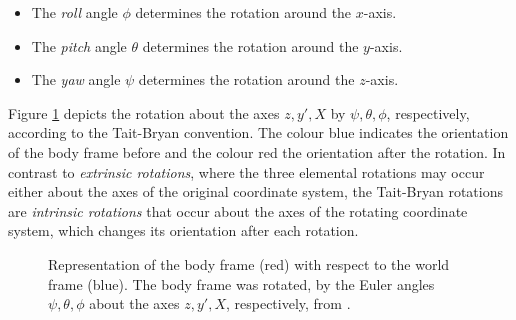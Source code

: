 \begin{itemize}
\item The \emph{roll} angle $\phi$ determines the rotation around the $x$-axis.
\item The \emph{pitch} angle $\theta$ determines the rotation around the $y$-axis.
\item The \emph{yaw} angle $\psi$ determines the rotation around the $z$-axis.
\end{itemize}

\noindent
Figure \ref{fig:Euler_angles} depicts the rotation about the axes $z, y', X$ by $\psi, \theta, \phi$, respectively, according to the Tait-Bryan convention. The colour blue indicates the orientation of the body frame before and the colour red the orientation after the rotation. In contrast to \emph{extrinsic rotations}, where the three elemental rotations may occur either about the axes of the original coordinate system, the Tait-Bryan rotations are \emph{intrinsic rotations} that occur about the axes of the rotating coordinate system, which changes its orientation after each rotation.

\begin{figure}
\centering
{}
\caption{Representation of the body frame (red) with respect to the world frame (blue). The body frame was rotated, by the Euler angles $\psi, \theta, \phi$ about the axes $z, y', X$, respectively, from \cite{Wiki_taitbryan}.} \label{fig:Euler_angles}
\end{figure}

